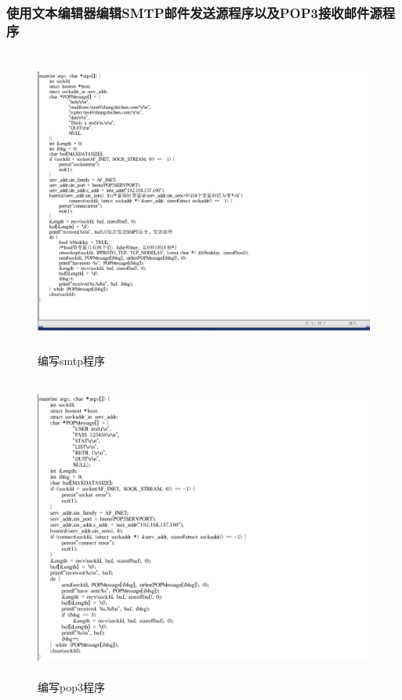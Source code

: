 \documentclass{article}
\begin{document}
\subsubsection{使用文本编辑器编辑SMTP邮件发送源程序以及POP3接收邮件源程序}
\begin{figure}[h]
    \centering
    \includegraphics[width=14cm,height=10cm]{11.png}
    \caption{编写smtp程序}
\end{figure}
\begin{figure}[h]
    \centering
    \includegraphics[width=14cm,height=10cm]{14.png}
    \caption{编写pop3程序}
\end{figure}
\newpage
\end{document}
